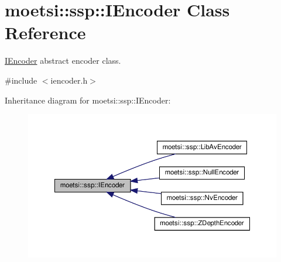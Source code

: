\hypertarget{classmoetsi_1_1ssp_1_1IEncoder}{}\section{moetsi\+:\+:ssp\+:\+:I\+Encoder Class Reference}
\label{classmoetsi_1_1ssp_1_1IEncoder}


\hyperlink{classmoetsi_1_1ssp_1_1IEncoder}{I\+Encoder} abstract encoder class.  




{\ttfamily \#include $<$iencoder.\+h$>$}



Inheritance diagram for moetsi\+:\+:ssp\+:\+:I\+Encoder\+:\nopagebreak
\begin{figure}[H]
\begin{center}
\leavevmode
\includegraphics[width=350pt]{classmoetsi_1_1ssp_1_1IEncoder__inherit__graph}
\end{center}
\end{figure}
